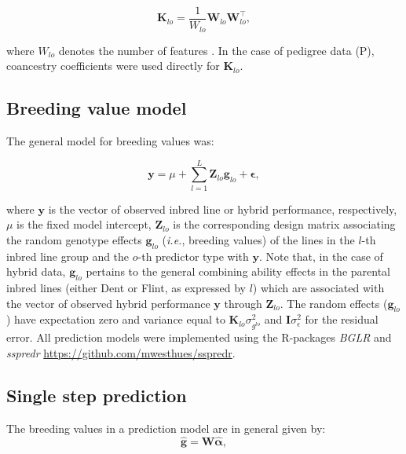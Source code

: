 \documentclass[12pt,titlepage]{article}
\begin{document}
\begin{equation} \label{eq:GenomicRelationship}
  \mathbf{K}_{lo} = \frac{1}{W_{lo}} \mathbf{W}_{lo} \mathbf{W}_{lo}^{\top},
\end{equation}

where $W_{lo}$ denotes the number of features \cite{VanRaden2008}.
In the case of pedigree data (P), coancestry coefficients were used directly
for $\mathbf{K}_{lo}$.





\subsection{Breeding value model}
The general model for breeding values was:

\begin{equation} \label{eq:KBLUPModel}
  \mathbf{y} = \mu + 
  \sum_{l=1}^{L} \mathbf{Z}_{lo} \mathbf{g}_{lo} +
  \mathbf{\epsilon},
\end{equation}


where $\mathbf{y}$ is the vector of observed inbred line or hybrid performance,
respectively, $\mu$ is the fixed model intercept, $\mathbf{Z}_{lo}$ is the 
corresponding design matrix associating the random genotype effects
$\mathbf{g}_{lo}$ (\textit{i.e.}, breeding values) of the lines in the $l$-th 
inbred line group and the $o$-th predictor type with $\mathbf{y}$.
Note that, in the case of hybrid data, $\mathbf{g}_{lo}$ pertains to the
general combining ability effects in the parental inbred lines (either Dent or
Flint, as expressed by $l$) which are associated with the vector of
observed hybrid performance $\mathbf{y}$ through $\mathbf{Z}_{lo}$.
The random effects ($\mathbf{g}_{lo}$) have expectation zero and variance equal 
to $\mathbf{K}_{lo} \sigma^{2}_{{g}^{lo}}$ and $\mathbf{I} \sigma^2_{\epsilon}$ 
for the residual error.
All prediction models were implemented using the R-packages \textit{BGLR}
\cite{Perez2014} and \textit{sspredr}
\url{https://github.com/mwesthues/sspredr}. 





\subsection{Single step prediction}
The breeding values in a prediction model are in general given by:
\begin{equation} \label{eq:mrnaebv}
	\mathbf{\hat{g}} = \mathbf{W}\boldsymbol{\hat{\alpha}},
\end{equation}
\end{document}
